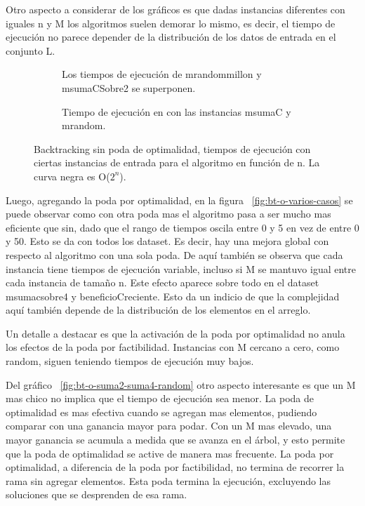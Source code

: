 \documentclass[10pt,a4paper]{article}
\begin{document}
Otro aspecto a considerar de los gráficos es que dadas instancias diferentes con iguales n y M los algoritmos suelen demorar lo mismo, es decir, el tiempo de ejecución no parece depender de la distribución de los datos de entrada en el conjunto L.

\begin{figure}[H]
    \centering
    \begin{subfigure}{0.49\linewidth}
        \centering
        
        \caption{Los tiempos de ejecución de mrandommillon y msumaCSobre2 se superponen. }
        \label{fig:bt-sobre2-sobre4-millon-random}
    \end{subfigure}
    \begin{subfigure}{0.49\linewidth}
        \centering
        
        \caption{Tiempo de ejecución en con las instancias msumaC y mrandom.}
        \label{fig:bt-msumaC-mrandom}
    \end{subfigure}
    \caption{Backtracking sin poda de optimalidad, tiempos de ejecución con ciertas instancias de entrada para el algoritmo en función de n. La curva negra es O($2^n$).}
\end{figure}


Luego, agregando la poda por optimalidad, en la figura ~\ref{fig:bt-o-varios-casos} se puede observar como con otra poda mas el algoritmo pasa a ser mucho mas eficiente que sin, dado que el rango de tiempos oscila entre 0 y 5 en vez de entre 0 y 50. Esto se da con todos los dataset. Es decir, hay una mejora global con respecto al algoritmo con una sola poda. De aquí también se observa que cada instancia tiene tiempos de ejecución variable, incluso si M se mantuvo igual entre cada instancia de tamaño n. Este efecto aparece sobre todo en el dataset msumacsobre4 y beneficioCreciente. Esto da un indicio de que la complejidad aquí también depende de la distribución de los elementos en el arreglo.

Un detalle a destacar es que la activación de la poda por optimalidad no anula los efectos de la poda por factibilidad. Instancias con M cercano a cero, como random, siguen teniendo tiempos de ejecución muy bajos. 

Del gráfico ~\ref{fig:bt-o-suma2-suma4-random} otro aspecto interesante es que un M mas chico no implica que el tiempo de ejecución sea menor. La poda de optimalidad es mas efectiva cuando se agregan mas elementos, pudiendo comparar con una ganancia mayor para podar. Con un M mas elevado, una mayor ganancia se acumula a medida que se avanza en el árbol, y esto permite que la poda de optimalidad se active de manera mas frecuente. La poda por optimalidad, a diferencia de la poda por factibilidad, no termina de recorrer la rama sin agregar elementos. Esta poda termina la ejecución, excluyendo las soluciones que se desprenden de esa rama.  
\end{document}

